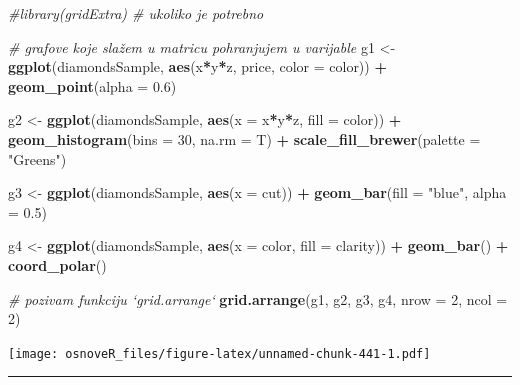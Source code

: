 \documentclass[]{book}
\newenvironment{Shaded}{\begin{snugshade}}{\end{snugshade}}
\newcommand{\KeywordTok}[1]{\textcolor[rgb]{0.13,0.29,0.53}{\textbf{#1}}}
\newcommand{\DataTypeTok}[1]{\textcolor[rgb]{0.13,0.29,0.53}{#1}}
\newcommand{\DecValTok}[1]{\textcolor[rgb]{0.00,0.00,0.81}{#1}}
\newcommand{\FloatTok}[1]{\textcolor[rgb]{0.00,0.00,0.81}{#1}}
\newcommand{\StringTok}[1]{\textcolor[rgb]{0.31,0.60,0.02}{#1}}
\newcommand{\CommentTok}[1]{\textcolor[rgb]{0.56,0.35,0.01}{\textit{#1}}}
\newcommand{\OperatorTok}[1]{\textcolor[rgb]{0.81,0.36,0.00}{\textbf{#1}}}
\newcommand{\NormalTok}[1]{#1}
\theoremstyle{definition}
\theoremstyle{definition}
\theoremstyle{definition}
\theoremstyle{remark}
\begin{document}
\begin{Shaded}
\begin{Highlighting}[]
\CommentTok{#library(gridExtra)    # ukoliko je potrebno}

\CommentTok{# grafove koje slažem u matricu pohranjujem u varijable}
\NormalTok{g1 <-}\StringTok{ }\KeywordTok{ggplot}\NormalTok{(diamondsSample, }\KeywordTok{aes}\NormalTok{(x}\OperatorTok{*}\NormalTok{y}\OperatorTok{*}\NormalTok{z, price, }\DataTypeTok{color =}\NormalTok{ color)) }\OperatorTok{+}\StringTok{ }
\StringTok{  }\KeywordTok{geom_point}\NormalTok{(}\DataTypeTok{alpha =} \FloatTok{0.6}\NormalTok{)}

\NormalTok{g2 <-}\StringTok{ }\KeywordTok{ggplot}\NormalTok{(diamondsSample, }\KeywordTok{aes}\NormalTok{(}\DataTypeTok{x =}\NormalTok{ x}\OperatorTok{*}\NormalTok{y}\OperatorTok{*}\NormalTok{z, }\DataTypeTok{fill =}\NormalTok{ color)) }\OperatorTok{+}\StringTok{ }
\StringTok{  }\KeywordTok{geom_histogram}\NormalTok{(}\DataTypeTok{bins =} \DecValTok{30}\NormalTok{, }\DataTypeTok{na.rm =}\NormalTok{ T) }\OperatorTok{+}\StringTok{ }
\StringTok{  }\KeywordTok{scale_fill_brewer}\NormalTok{(}\DataTypeTok{palette =} \StringTok{"Greens"}\NormalTok{)}

\NormalTok{g3 <-}\StringTok{ }\KeywordTok{ggplot}\NormalTok{(diamondsSample, }\KeywordTok{aes}\NormalTok{(}\DataTypeTok{x =}\NormalTok{ cut)) }\OperatorTok{+}\StringTok{ }
\StringTok{  }\KeywordTok{geom_bar}\NormalTok{(}\DataTypeTok{fill =} \StringTok{"blue"}\NormalTok{, }\DataTypeTok{alpha =} \FloatTok{0.5}\NormalTok{)}

\NormalTok{g4 <-}\StringTok{ }\KeywordTok{ggplot}\NormalTok{(diamondsSample, }\KeywordTok{aes}\NormalTok{(}\DataTypeTok{x =}\NormalTok{ color, }\DataTypeTok{fill =}\NormalTok{ clarity)) }\OperatorTok{+}\StringTok{ }
\StringTok{  }\KeywordTok{geom_bar}\NormalTok{() }\OperatorTok{+}\StringTok{ }\KeywordTok{coord_polar}\NormalTok{()}

\CommentTok{# pozivam funkciju `grid.arrange`}
\KeywordTok{grid.arrange}\NormalTok{(g1, g2, g3, g4, }\DataTypeTok{nrow =} \DecValTok{2}\NormalTok{, }\DataTypeTok{ncol =} \DecValTok{2}\NormalTok{)}
\end{Highlighting}
\end{Shaded}

\texttt{[image: osnoveR\_files/figure-latex/unnamed-chunk-441-1.pdf]}

\begin{center}\rule{0.5\linewidth}{\linethickness}\end{center}
\end{document}
